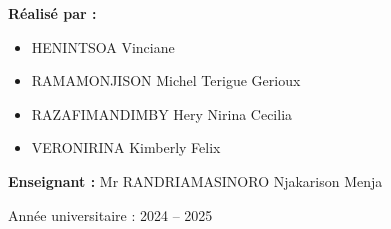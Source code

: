 \vspace{2cm}
\small\textbf{Réalisé par :}
\begin{itemize}
  \item HENINTSOA Vinciane
  \item RAMAMONJISON Michel Terigue Gerioux
  \item RAZAFIMANDIMBY Hery Nirina Cecilia
  \item VERONIRINA Kimberly Felix
\end{itemize}
\vspace{1em}
\small\textbf{Enseignant :} Mr RANDRIAMASINORO Njakarison Menja
\vspace{5em}
\begin{center}
\small Année universitaire : 2024 -- 2025
\end{center}
